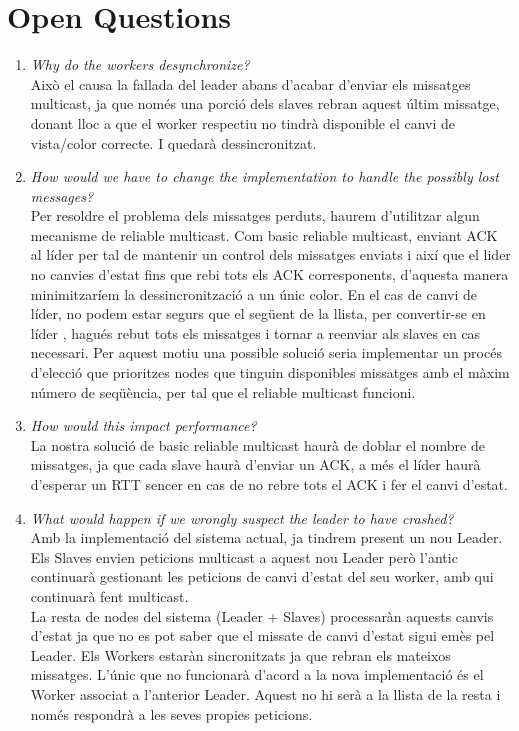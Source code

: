 \documentclass[a4paper, 10pt]{article}
\begin{document}
\newpage\section{Open Questions}
\begin{enumerate}
    \item\textit{Why do the workers desynchronize?}\\
    Això el causa la fallada del leader abans d'acabar d'enviar els missatges multicast, ja que només una porció dels slaves rebran aquest últim missatge, donant lloc a que el worker respectiu no tindrà disponible el canvi de vista/color correcte. I quedarà dessincronitzat.
    \item\textit{How would we have to change the implementation to handle the possibly lost messages?}\\
    Per resoldre el problema dels missatges perduts, haurem d'utilitzar algun mecanisme de reliable multicast. Com basic reliable multicast, enviant ACK al líder per tal de mantenir un control dels missatges enviats i així que el lider no canvies d'estat fins que rebi tots els ACK corresponents, d'aquesta manera minimitzaríem la dessincronització a un únic color.
En el cas de canvi de líder, no podem estar segurs que el següent de la llista, per convertir-se en líder , hagués rebut tots els missatges i tornar a reenviar als slaves en cas necessari. Per aquest motiu una possible solució seria implementar un procés d'elecció que prioritzes nodes que tinguin disponibles missatges amb el màxim número de seqüència, per tal que el reliable multicast funcioni.\\
    \newpage\item \textit{How would this impact performance?}\\
La nostra solució de basic reliable multicast haurà de doblar el nombre de missatges, ja que cada slave haurà d'enviar un ACK, a més el líder haurà d'esperar un RTT sencer en cas de no rebre tots el ACK i fer el canvi d'estat.

    \item \textit{What would happen if we wrongly suspect the leader to have crashed?}\\
    Amb la implementació del sistema actual, ja tindrem present un nou Leader. Els Slaves envien peticions multicast a aquest nou Leader però l'antic continuarà gestionant les peticions de canvi d'estat del seu worker, amb qui continuarà fent multicast.\\
    La resta de nodes del sistema (Leader + Slaves) processaràn aquests canvis d'estat ja que no es pot saber que el missate de canvi d'estat sigui emès pel Leader. Els Workers estaràn sincronitzats ja que rebran els mateixos missatges. L'únic que no funcionarà d'acord a la nova implementació és el Worker associat a l'anterior Leader. Aquest no hi serà a la llista de la resta i només respondrà a les seves propies peticions.\end{enumerate}
\end{document}
